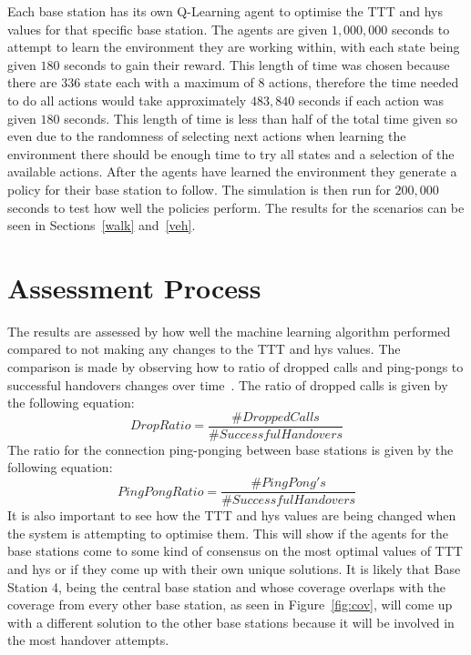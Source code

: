 Each base station has its own Q-Learning agent to optimise the TTT and hys values for that specific base station. The agents are given $1,000,000$ seconds to attempt to learn the environment they are working within, with each state being given $180$ seconds to gain their reward. This length of time was chosen because there are 336 state each with a maximum of 8 actions, therefore the time needed to do all actions would take approximately $483,840$ seconds if each action was given $180$ seconds. This length of time is less than half of the total time given so even due to the randomness of selecting next actions when learning the environment there should be enough time to try all states and a selection of the available actions. After the agents have learned the environment they generate a policy for their base station to follow. The simulation is then run for $200,000$ seconds to test how well the policies perform. The results for the scenarios can be seen in Sections~\ref{walk} and~\ref{veh}.
\section{Assessment Process}\label{results}
The results are assessed by how well the machine learning algorithm performed compared to not making any changes to the TTT and hys values. The comparison is made by observing how to ratio of dropped calls and ping-pongs to successful handovers changes over time~\cite{sinclair2013advanced}. The ratio of dropped calls is given by the following equation:
\begin{equation}\label{eq:drop}
Drop Ratio = \frac{\#Dropped Calls}{\#Successful Handovers}
\end{equation}
The ratio for the connection ping-ponging between base stations is given by the following equation:
\begin{equation}\label{eq:ping}
PingPong Ratio = \frac{\#PingPong's}{\#Successful Handovers}
\end{equation}
It is also important to see how the TTT and hys values are being changed when the system is attempting to optimise them. This will show if the agents for the base stations come to some kind of consensus on the most optimal values of TTT and hys or if they come up with their own unique solutions. It is likely that Base Station 4, being the central base station and whose coverage overlaps with the coverage from every other base station, as seen in Figure~\ref{fig:cov}, will come up with a different solution to the other base stations because it will be involved in the most handover attempts.

